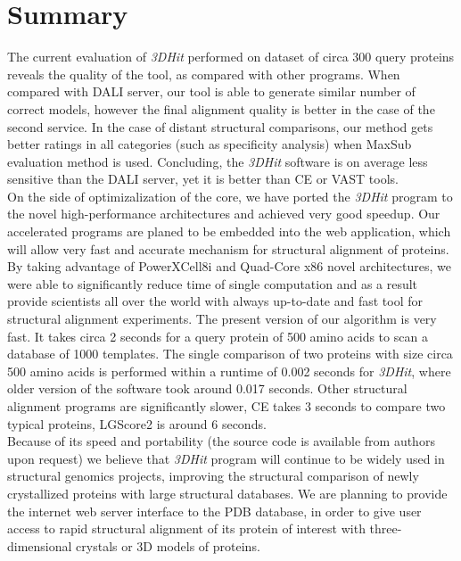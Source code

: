 \documentclass[envcountsame,envcountchap]{svmono}
\newcommand{\prog}{\emph{3DHit}}
\begin{document}
\section{Summary}
The current evaluation of \prog{} performed on dataset of circa 300 query proteins
reveals the quality of the tool, as compared with other programs. When compared
with DALI server, our tool is able to generate similar number of correct models, however
the final alignment quality is better in the case of the second service. In the 
case of distant structural comparisons, our method gets better ratings in all categories
(such as specificity analysis) when MaxSub evaluation method is used.
Concluding, the \prog{} software is on average less sensitive than the DALI
server, yet it is better than CE or VAST tools.\\
On the side of optimizalization of the core, we have ported the \prog{} 
program to the novel high-performance
architectures and achieved very good speedup.
Our accelerated programs are planed to be embedded into the web application,
which will allow very fast and accurate mechanism for structural alignment of
proteins.
By taking advantage of PowerXCell8i and Quad-Core x86 novel architectures,
we were able to significantly reduce time of single computation and as a result
provide scientists all over the world with always up-to-date and fast tool for
structural alignment experiments.
The present version of our algorithm is very fast. It takes circa 2 seconds 
for a query protein of 500 amino acids to scan a database of 1000 templates.
The single comparison of two proteins with size circa 500 amino acids 
is performed within a runtime of 0.002 seconds for \prog{}, where 
older version of the software took around 0.017 seconds. Other structural
alignment programs are significantly slower, CE takes 3 seconds to compare two
typical proteins, LGScore2 is around 6 seconds. \\
Because of its speed and portability (the source code is available from authors 
upon request) we believe that \prog{} program will continue to be widely used
in structural genomics projects, improving the structural comparison of  newly crystallized
proteins with large structural databases. We are planning to provide the internet web
server interface to the PDB database, in order to give user access to rapid structural 
alignment of its protein of interest with three-dimensional crystals or 3D models
of proteins. 
\end{document}
